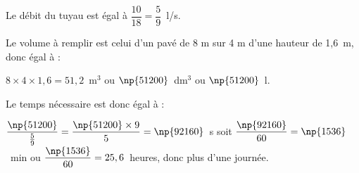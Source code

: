 
\medskip

%
%
%
Le débit du tuyau est égal à $\dfrac{10}{18} = \dfrac{5}{9}$~l/s.

Le volume à remplir est celui d'un pavé de 8 m sur 4 m d'une hauteur de 1,6~m, donc égal à :

$8 \times 4 \times 1,6 = 51,2$~m$^3$ ou $\np{51200}$~dm$^3$ ou $\np{51200}$~l.

Le temps nécessaire est donc égal à :

$\dfrac{\np{51200}}{\frac{5}{9}} = \dfrac{\np{51200} \times 9}{5} = \np{92160}$~s soit $\dfrac{\np{92160}}{60} = \np{1536}$~min ou $\dfrac{\np{1536}}{60} = 25,6$~heures, donc plus d'une journée.
\bigskip

